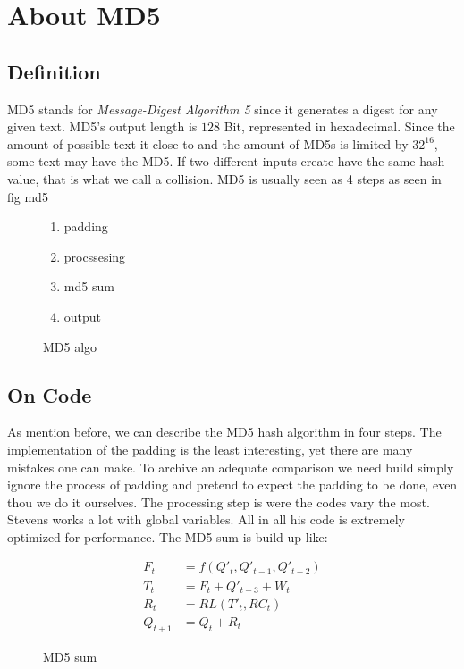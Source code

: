 \chapter{About MD5}
\label{chapter:kap2}
\section{Definition}
MD5 stands for \textit{Message-Digest Algorithm 5} since it generates a digest for any given text. MD5's output length is $128$ Bit, represented in hexadecimal. Since the amount of possible text it close to
and the amount of MD5s is limited by $32^{16}$, some text may have the MD5. If two different inputs create have the same hash value, that is what we call a collision.
MD5 is usually seen as 4 steps as seen in fig {md5}\\
\begin{figure}
    \begin{enumerate}
        \item padding
        \item procssesing
        \item md5 sum 
        \item output
    \end{enumerate}
\caption{MD5 algo}
\label{md5}
\end{figure}

\section{On Code}

As mention before, we can describe the MD5 hash algorithm in four steps.
The implementation of the padding is the least interesting, yet there are many mistakes one can make.
To archive an adequate comparison we need build simply ignore the process of padding and pretend to expect the padding to be done, even thou we do it ourselves.
The processing step is were the codes vary the most. Stevens works a lot with global variables. All in all his code is extremely optimized for performance.
The MD5 sum is build up like:\\
\begin{figure}
    \begin{align*}
        F_t &= f \left( Q'_t,Q'_{t-1},Q'_{t-2} \right) \\
        T_t &=  F_t + Q'_{t-3} +  W_t \\
        R_t &=  RL \left(T'_t,RC_t \right) \\
        Q_{t+1} &=  Q_t +  R_t
    \end{align*}
    \caption[short]{MD5 sum}
\label{md5sum}
\end{figure}
